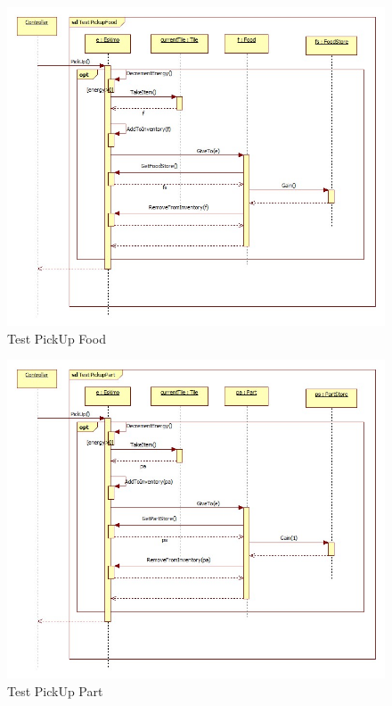 \begin{figure}[H]
	\begin{center}
		\includegraphics[width=17cm]{chapters/chapter05/diagrams/TestPickUpFood.jpg}
		\caption{Test PickUp Food}
		\label{fig:Test PickUp Food}
	\end{center}
\end{figure}

\begin{figure}[H]
	\begin{center}
		\includegraphics[width=17cm]{chapters/chapter05/diagrams/TestPickUpPart.jpg}
		\caption{Test PickUp Part}
		\label{fig:Test PickUp Part}
	\end{center}
\end{figure}

